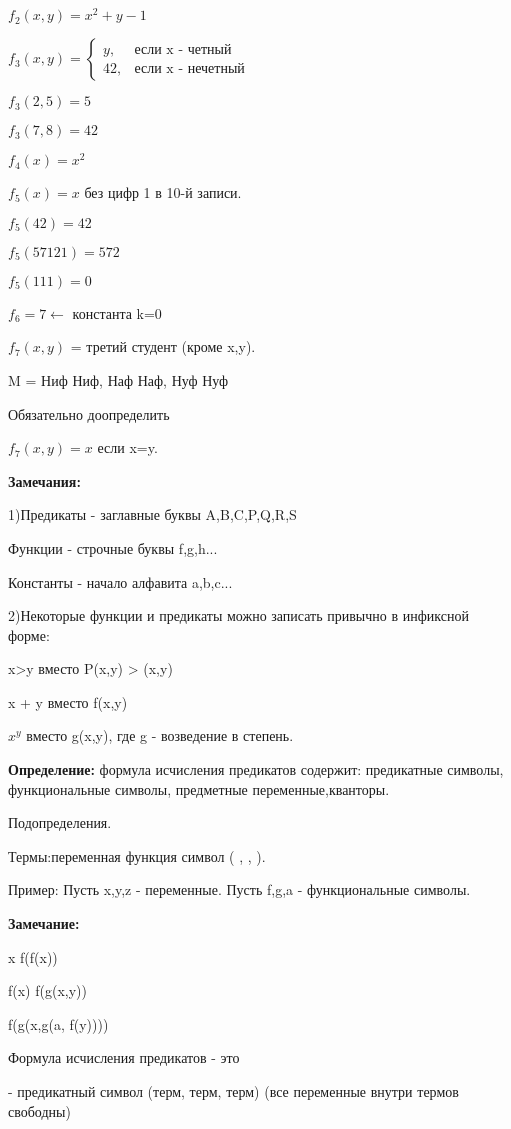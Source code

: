 \documentclass{article}
\begin{document}
$f_2(x,y) = x^2 + y - 1$

$f_3(x,y) = 
\begin{cases}
y, &\text{если x - четный}\\
42, &\text{если x - нечетный}
\end{cases}$

$f_3(2,5) = 5$

$f_3(7,8) = 42$

$f_4(x) = x^2$

$f_5(x) = x$ без цифр 1 в 10-й записи.

$f_5(42) = 42$

$f_5(57121) = 572$

$f_5(111) = 0$

$f_6 = 7 \longleftarrow$ константа k=0

$f_7(x,y)$ = третий студент (кроме x,y).

M = {Ниф Ниф, Наф Наф, Нуф Нуф}

Обязательно доопределить

$f_7(x,y) = x$ если x=y.

\textbf{Замечания:}

1)Предикаты - заглавные буквы A,B,C,P,Q,R,S

Функции - строчные буквы f,g,h...

Константы - начало алфавита a,b,c...

2)Некоторые функции и предикаты можно записать привычно в инфиксной форме:

x>y вместо P(x,y) > (x,y)

x + y вместо f(x,y)

$x^y$ вместо g(x,y), где g - возведение в степень.

\textbf{Определение:} 
формула исчисления предикатов содержит: предикатные символы, функциональные символы, предметные переменные,кванторы.

Подопределения.

Термы:переменная функция символ ( , , ).

Пример: Пусть x,y,z - переменные. Пусть f,g,a - функциональные символы.

\textbf{Замечание:}

x f(f(x))

f(x) f(g(x,y))

f(g(x,g(a, f(y))))

Формула исчисления предикатов - это

- предикатный символ (терм, терм, терм) (все переменные внутри термов свободны)
\end{document}

